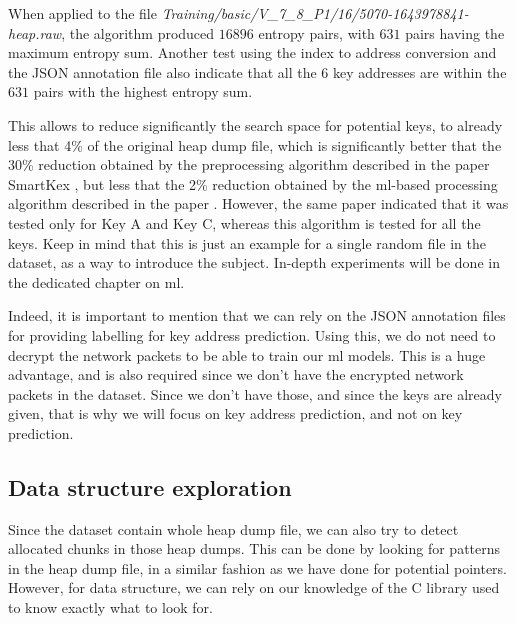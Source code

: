     When applied to the file \textit{Training/basic/V\_7\_8\_P1/16/5070-1643978841-heap.raw}, the algorithm produced $ 16896 $ entropy pairs, with $ 631 $ pairs having the maximum entropy sum. Another test using the index to address conversion and the JSON annotation file also indicate that all the 6 key addresses are within the $ 631 $ pairs with the highest entropy sum.
    
    This allows to reduce significantly the search space for potential keys, to already less that 4\% of the original heap dump file, which is significantly better that the 30\% reduction obtained by the preprocessing algorithm described in the paper SmartKex \cite{SmartKex22}, but less that the 2\% reduction obtained by the \acrshort{ml}-based processing algorithm described in the paper \cite{SmartKex22}. However, the same paper indicated that it was tested only for Key A and Key C, whereas this algorithm is tested for all the keys. Keep in mind that this is just an example for a single random file in the dataset, as a way to introduce the subject. In-depth experiments will be done in the dedicated chapter on \acrlong{ml}.

    Indeed, it is important to mention that we can rely on the JSON annotation files for providing labelling for key address prediction. Using this, we do not need to decrypt the network packets to be able to train our \acrshort{ml} models. This is a huge advantage, and is also required since we don't have the encrypted network packets in the dataset. Since we don't have those, and since the keys are already given, that is why we will focus on key address prediction, and not on key prediction.

    \subsection{Data structure exploration}
    Since the dataset contain whole heap dump file, we can also try to detect allocated chunks in those heap dumps. This can be done by looking for patterns in the heap dump file, in a similar fashion as we have done for potential pointers. However, for data structure, we can rely on our knowledge of the C library used to know exactly what to look for.
    
